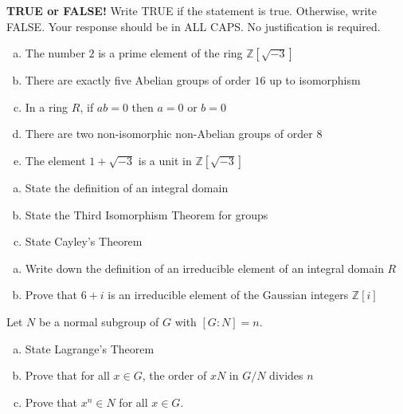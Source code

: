 \documentclass[11pt]{exam}
\theoremstyle{definition}
\begin{document}
\begin{questions}

\addpoints

\question[10]\mbox{}
\textbf{TRUE or FALSE!}  Write  TRUE if the statement is true.  Otherwise, write FALSE.  Your response should be in ALL CAPS.  No justification is required.
\begin{enumerate}[(a)]
\item  The number $2$ is a prime element of the ring $\mathbb Z[\sqrt{-3}]$
\vspace{1.3in}
\item  There are exactly five Abelian groups of order $16$ up to isomorphism
\vspace{1.3in}
\item  In a ring $R$, if $ab=0$ then $a=0$ or $b=0$
\vspace{1.3in}
\item  There are two non-isomorphic non-Abelian groups of order $8$
\vspace{1.3in}
\item  The element $1+\sqrt{-3}$ is a unit in $\mathbb Z[\sqrt{-3}]$
\vspace{1.3in}
\end{enumerate}

\newpage
\question[10]\mbox{}
\begin{enumerate}[(a)]
\item  State the definition of an integral domain
\vspace{2in}
\item  State the Third Isomorphism Theorem for groups
\vspace{2in}
\item  State Cayley's Theorem
\end{enumerate}

\newpage
\question[10]\mbox{}

\begin{enumerate}[(a)]
\item Write down the definition of an irreducible element of an integral domain $R$
\vspace{2in}
\item Prove that $6+i$ is an irreducible element of the Gaussian integers $\mathbb Z[i]$
\end{enumerate}


\newpage
\question[10]\mbox{}

Let $N$ be a normal subgroup of $G$ with $[G:N] = n$.
\begin{enumerate}[(a)]
\item State Lagrange's Theorem
\vspace{2in}
\item Prove that for all $x\in G$, the order of $xN$ in $G/N$ divides $n$
\vspace{2in}
\item Prove that $x^n\in N$ for all $x\in G$.
\end{enumerate}


\end{questions}
\end{document}
